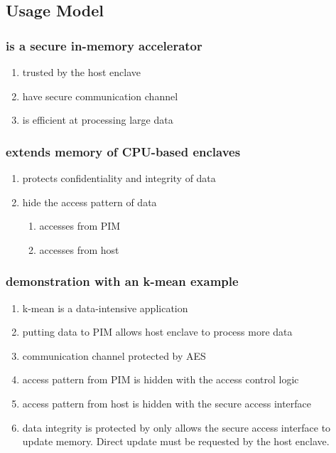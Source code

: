 \documentclass[11pt]{article}
\begin{document}
\subsection{Usage Model}
\label{sec:org853483c}
\subsubsection{is a secure in-memory accelerator}
\label{sec:orgf12966a}
\begin{enumerate}
\item trusted by the host enclave
\label{sec:org850e42f}
\item have secure communication channel
\label{sec:org72499c1}
\item is efficient at processing large data
\label{sec:org7235504}
\end{enumerate}
\subsubsection{extends memory of CPU-based enclaves}
\label{sec:orgc8bf6bc}
\begin{enumerate}
\item protects confidentiality and integrity of data
\label{sec:orgc628c89}
\item hide the access pattern of data
\label{sec:org3e8941f}
\begin{enumerate}
\item accesses from PIM
\label{sec:orga86551d}
\item accesses from host
\label{sec:orge814af2}
\end{enumerate}
\end{enumerate}
\subsubsection{demonstration with an k-mean example}
\label{sec:org1b3e249}
\begin{enumerate}
\item k-mean is a data-intensive application
\label{sec:org33d53a8}
\item putting data to PIM allows host enclave to process more data
\label{sec:org4d4cf17}
\item communication channel protected by AES
\label{sec:orgc21f5f1}
\item access pattern from PIM is hidden with the access control logic
\label{sec:orgb7f603e}
\item access pattern from host is hidden with the secure access interface
\label{sec:org0211bff}
\item data integrity is protected by only allows the secure access interface to update memory. Direct update must be requested by the host enclave.
\label{sec:org891e263}
\end{enumerate}
\end{document}
